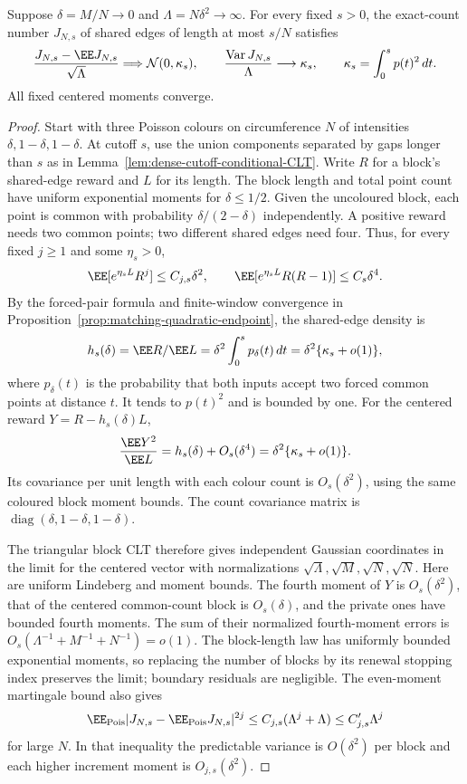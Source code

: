 \documentclass[11pt,letterpaper]{article}
\begin{document}
\begin{lemma}
\label{lem:rare-common-cutoff-CLT}
Suppose $\delta=M/N\to0$ and $\Lambda=N\delta^2\to\infty$.
For every fixed $s>0$, the exact-count number $J_{N,s}$ of
shared edges of length at most $s/N$ satisfies
\begin{equation}\label{eq:rare-common-cutoff-CLT}
 \frac{J_{N,s}-\EE J_{N,s}}{\sqrt\Lambda}
       \Longrightarrow\mathcal N(0,\kappa_s),\qquad
 \frac{\operatorname{Var}J_{N,s}}{\Lambda}\longrightarrow\kappa_s,
 \qquad \kappa_s=\int_0^s p(t)^2\,dt.
\end{equation}
All fixed centered moments converge.
\end{lemma}
\begin{proof}
Start with three Poisson colours on circumference $N$ of
intensities $\delta,1-\delta,1-\delta$.
At cutoff $s$, use the union components separated by gaps
longer than $s$ as in Lemma~\ref{lem:dense-cutoff-conditional-CLT}.
Write $R$ for a block's shared-edge reward and $L$ for its
length. The block length and total point count have uniform
exponential moments for $\delta\le1/2$.
Given the uncoloured block, each point is common with
probability $\delta/(2-\delta)$ independently.
A positive reward needs two common points; two different
shared edges need four. Thus, for every fixed $j\ge1$ and
some $\eta_s>0$,
\[
 \EE[e^{\eta_s L}R^j]\le C_{j,s}\delta^2,\qquad
 \EE[e^{\eta_s L}R(R-1)]\le C_s\delta^4.
\]
By the forced-pair formula and finite-window convergence
in Proposition~\ref{prop:matching-quadratic-endpoint},
the shared-edge density is
\[
 h_s(\delta)=\EE R/\EE L
       =\delta^2\int_0^s p_\delta(t)\,dt
       =\delta^2\{\kappa_s+o(1)\},
\]
where $p_\delta(t)$ is the probability that both inputs
accept two forced common points at distance $t$.
It tends to $p(t)^2$ and is bounded by one.
For the centered reward $Y=R-h_s(\delta)L$,
\[
 \frac{\EE Y^2}{\EE L}
       =h_s(\delta)+O_s(\delta^4)
       =\delta^2\{\kappa_s+o(1)\}.
\]
Its covariance per unit length with each colour count is
$O_s(\delta^2)$, using the same coloured block moment bounds.
The count covariance matrix is
$\operatorname{diag}(\delta,1-\delta,1-\delta)$.

The triangular block CLT therefore gives independent Gaussian
coordinates in the limit for the centered vector with
normalizations $\sqrt\Lambda,\sqrt M,\sqrt N,\sqrt N$.
Here are uniform Lindeberg and moment bounds.
The fourth moment of $Y$ is $O_s(\delta^2)$, that of the
centered common-count block is $O_s(\delta)$, and the private
ones have bounded fourth moments. The sum of their normalized
fourth-moment errors is
$O_s(\Lambda^{-1}+M^{-1}+N^{-1})=o(1)$.
The block-length law has uniformly bounded exponential moments,
so replacing the number of blocks by its renewal stopping index
preserves the limit; boundary residuals are negligible.
The even-moment martingale bound also gives
\[
 \EE_{\rm Pois}|J_{N,s}-\EE_{\rm Pois}J_{N,s}|^{2j}
       \le C_{j,s}(\Lambda^j+\Lambda)
       \le C'_{j,s}\Lambda^j
\]
for large $N$. In that inequality the predictable variance
is $O(\delta^2)$ per block and each higher increment moment
is $O_{j,s}(\delta^2)$.


\end{proof}
\end{document}
